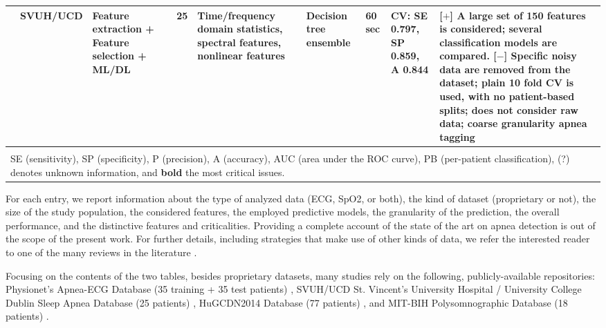 \documentclass[5p,twocolumn,lefttitle]{elsarticle}
\begin{document}
\begin{table*}[t]
{\begin{tabularx}{2\textwidth}{@{}m{2.5em}p{7em}p{10em}lp{2em}p{12em}p{7em}p{3em}p{17em}X@{}}
                            & SVUH/UCD                                                & Feature extraction + Feature selection + ML/DL                 & \cite{xie2012real}                       & 25            & Time/frequency domain statistics, spectral features, nonlinear features                                           & Decision tree ensemble              & 60 sec                                     & CV: SE 0.797, SP 0.859, A 0.844                                                                                                                                                       & [$+$] A large set of 150 features is considered; several classification models are compared. [$-$] \textbf{Specific noisy data are removed from the dataset}; \textbf{plain 10 fold CV is used, with no patient-based splits}; does not consider raw data; coarse granularity apnea tagging                                                                                                                                                                         \\
                            \bottomrule \\
\multicolumn{10}{l}{\large SE (sensitivity), SP (specificity), P (precision), A (accuracy), AUC (area under the ROC curve), PB (per-patient classification), (?) denotes unknown information, and \textbf{bold} the most critical issues.}
\end{tabularx}}
\end{table*}

For each entry, we report information about the type of analyzed data (ECG, SpO2, or both), the kind of dataset (proprietary or not), the size of the study population, the considered features, the employed predictive models, the granularity of the prediction, the overall performance, and the distinctive features and criticalities.  
Providing a complete account of the state of the art on apnea detection is out of the scope of the present work. For further details, including strategies that make use of other kinds of data, we refer the interested reader to one of the many reviews in the literature \cite{mostafa2019systematic,mendonca2018review,hassan2015comparative,pombo2017classification,gutierrez2021reliability}.

Focusing on the contents of the two tables, besides proprietary datasets, many studies rely on the following, publicly-available repositories: Physionet’s Apnea-ECG Database (35 training + 35 test patients) \cite{penzel2000apnea}, SVUH/UCD St. Vincent's University Hospital / University College Dublin Sleep Apnea Database (25 patients) \cite{heneghan2011st}, HuGCDN2014 Database (77 patients) \cite{huyygg}, and MIT-BIH Polysomnographic Database (18 patients) \cite{ichimaru1999development}.
\end{document}
